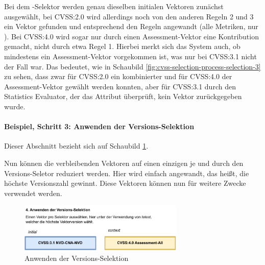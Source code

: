 Bei dem -Selektor werden genau dieselben initialen Vektoren zunächst ausgewählt, bei CVSS:2.0 wird allerdings noch von den anderen Regeln 2 und 3 ein Vektor gefunden und entsprechend den Regeln angewandt (alle Metriken, nur ).
Bei CVSS:4.0 wird sogar nur durch einen Assessment-Vektor eine Kontribution gemacht, nicht durch etwa Regel 1.
Hierbei merkt sich das System auch, ob mindestens ein Assessment-Vektor vorgekommen ist, was nur bei CVSS:3.1 nicht der Fall war.
Das bedeutet, wie in Schaubild \ref{fig:cvss-selection-process-selection-3} zu sehen, dass zwar für CVSS:2.0 ein kombinierter und für CVSS:4.0 der Assessment-Vektor gewählt werden konnten, aber für CVSS:3.1 durch den Statistics Evaluator, der das  Attribut überprüft, kein Vektor zurückgegeben wurde.

\paragraph{Beispiel, Schritt 3: Anwenden der Versions-Selektion} \label{par:projektbericht-loesungsweg-cvss-selection-example-step-4}

Dieser Abschnitt bezieht sich auf Schaubild \ref{fig:cvss-selection-process-selection-4}.

Nun können die verbleibenden Vektoren auf einen einzigen je  und  durch den Versions-Seletor reduziert werden.
Hier wird einfach  angewandt, das heißt, die höchste Versionszahl gewinnt.
Diese Vektoren können nun für weitere Zwecke verwendet werden.

\begin{figure}[htbp] %
    \centering
    \includegraphics[width=0.7\textwidth, keepaspectratio]{res/grafiken/cvss-selection-process-selection-4}
    \caption{Anwenden der Versions-Selektion}
    \label{fig:cvss-selection-process-selection-4}
\end{figure}
